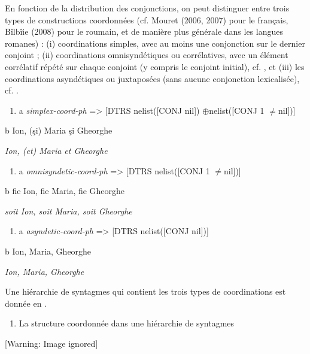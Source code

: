 En fonction de la distribution des conjonctions, on peut distinguer entre trois types de constructions coordonnées (cf. Mouret (2006, 2007) pour le français, Bîlbîie (2008) pour le roumain, et de manière plus générale dans les langues romanes) : (i) coordinations simples, avec au moins une conjonction sur le dernier conjoint  ; (ii) coordinations omnisyndétiques ou corrélatives, avec un élément corrélatif répété sur chaque conjoint (y compris le conjoint initial), cf. , et (iii) les coordinations asyndétiques ou juxtaposées (sans aucune conjonction lexicalisée), cf. . 


\begin{enumerate}
\item \label{bkm:Ref290401511}a  \textit{simplex-coord-ph} ={\textgreater} [DTRS nelist([CONJ nil]) ${{{\oplus}}}$nelist([CONJ 1 ${\neq}$nil])]  


\end{enumerate}
  b  Ion, (şi) Maria şi Gheorghe

    \textit{Ion, (et) Maria et Gheorghe}


\begin{enumerate}
\item \label{bkm:Ref290401542}a  \textit{omnisyndetic-coord-ph} ={\textgreater} [DTRS nelist([CONJ 1 ${\neq}$nil])]    


\end{enumerate}
  b  fie Ion, fie Maria, fie Gheorghe

    \textit{soit Ion, soit Maria, soit Gheorghe}


\begin{enumerate}
\item \label{bkm:Ref290401557}a  \textit{asyndetic-coord-ph} ={\textgreater} [DTRS nelist([CONJ nil])]  


\end{enumerate}
  b  Ion, Maria, Gheorghe

    \textit{Ion, Maria, Gheorghe}

Une hiérarchie de syntagmes qui contient les trois types de coordinations est donnée en . 


\begin{enumerate}
\item \label{bkm:Ref301799112}La structure coordonnée dans une hiérarchie de syntagmes


\end{enumerate}
{   [Warning: Image ignored] %
} 

